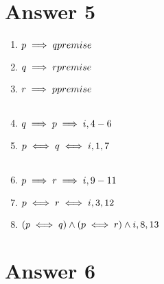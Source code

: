 \documentclass[12pt]{article}
\begin{document}
\section*{Answer 5}
\begin{table}[H]
\begin{enumerate}
\item $ p \implies q \hfill premise$
\item $ q \implies r          \hfill    premise$
\item $ r \implies p      \hfill    premise$\\
\begin{tabular}{|p{10cm}|}
\hline
\item $ q                    \hfill    assumed$
\item $ r              \hfill        \implies e,2,4$
\item $ p                \hfill       \implies e,3,5$\\
\hline
\end{tabular}
\item $ q \implies p              \hfill     \implies i,4-6$
\item $ p \iff q        \hfill   \iff i,1,7$\\
\begin{tabular}{|p{10cm}|}
\hline
\item $ p       \hfill          assumed$
\item $ q          \hfill      \implies e,1,9$
\item $ r       \hfill  \implies e,2,10$\\
\hline
\end{tabular}
\item $ p \implies r        \hfill   \implies i,9-11$
\item $ p \iff r                 \hfill     \iff i,3,12$
\item $ (p \iff q) \land (p \iff r)          \hfill     \land i,8,13$
\end{enumerate}
\end{table}
\section*{Answer 6}
\end{document}
